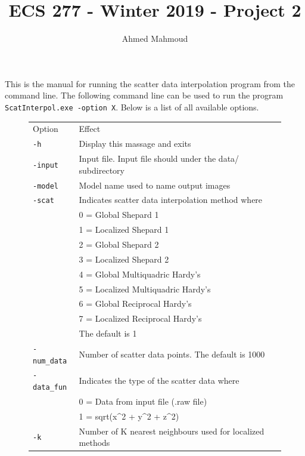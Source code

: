 \documentclass[12pt]{article}
\begin{document}
\captionsetup[subfigure]{labelformat=empty}

\title{ECS 277 - Winter 2019 - Project 2}
\author{Ahmed Mahmoud}
\date{} 

\maketitle

This is the manual for running the scatter data interpolation program from the command line. The following command line can be used to run the program \texttt{ScatInterpol.exe -option X}. Below is a list of all available options. 


\begin{figure}
  
\begin{tabular}{ |l| l|}
  \hline
  Option & Effect   \\ \hhline{|=|=|}
  \texttt{-h}         & Display this massage and exits \\
  \texttt{-input}     & Input file. Input file should under the \textsf{data/} subdirectory \\
  \texttt{-model}     & Model name used to name output images \\
  \texttt{-scat}      & Indicates scatter data interpolation method where \\
  				      & 0 = Global Shepard 1\\
  				      & 1 = Localized Shepard 1\\
  				      & 2 = Global Shepard 2\\
  				      & 3 = Localized Shepard 2\\
  				      & 4 = Global Multiquadric Hardy's\\
  				      & 5 = Localized Multiquadric Hardy's\\
  				      & 6 = Global Reciprocal Hardy's\\
  				      & 7 = Localized Reciprocal Hardy's\\
  				      & The default is 1\\
  \texttt{-num_data}  & Number of scatter data points. The default is 1000 \\  
  \texttt{-data_fun}  & Indicates the type of the scatter data where \\
                      & 0 = Data from input file (.raw file) \\
                      & 1 = sqrt(x^2 + y^2 + z^2) \\
  \texttt{-k}         & Number of K nearest neighbours used for localized methods \\

\end{tabular}
\end{figure}
\end{document}
